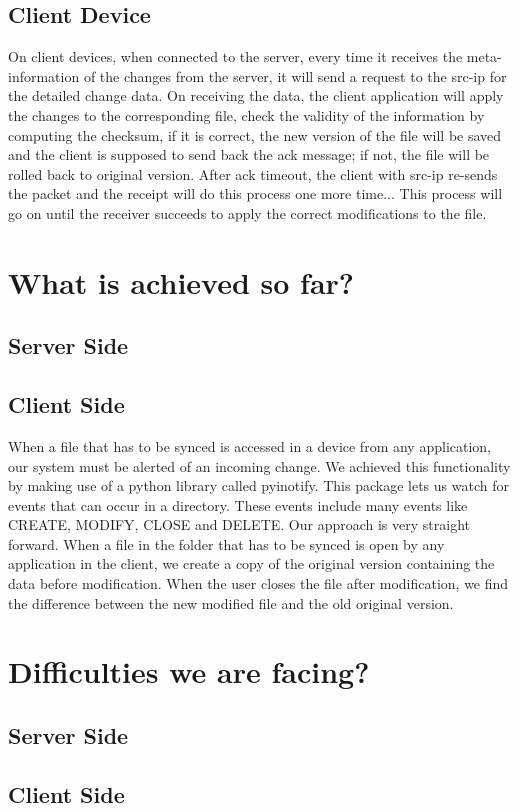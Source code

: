 \documentclass[paper=a4, fontsize=11pt]{scrartcl}
\numberwithin{equation}{section}		%
\numberwithin{figure}{section}			%
\numberwithin{table}{section}				%
\begin{document}
\subsection{Client Device}
On client devices, when connected to the server, every time it receives the meta-information of the changes from the server, it will send a request to the src-ip for the detailed change data. On receiving the data, the client application will apply the changes to the corresponding file, check the validity of the information by computing the checksum, if it is correct, the new version of the file will be saved and the client is supposed to send back the ack message; if not, the file will be rolled back to original version. After ack timeout, the client with src-ip re-sends the packet and the receipt will do this process one more time... This process will go on until the receiver succeeds to apply the correct modifications to the file. 
\section{What is achieved so far?}
\subsection{Server Side}
\subsection{Client Side}
When a file that has to be synced is accessed in a device from any application, our system must be alerted of an incoming change. We achieved this functionality by making use of a python library called pyinotify. This package lets us watch for events that can occur in a directory. These events include many events like CREATE, MODIFY, CLOSE and DELETE. Our approach is very straight forward. When a file in the folder that has to be synced is open by any application in the client, we create a copy of the original version containing the data before modification. When the user closes the file after modification, we find the difference between the new modified file and the old original version.
\section{Difficulties we are facing?}
\subsection{Server Side}
\subsection{Client Side}
\end{document}
